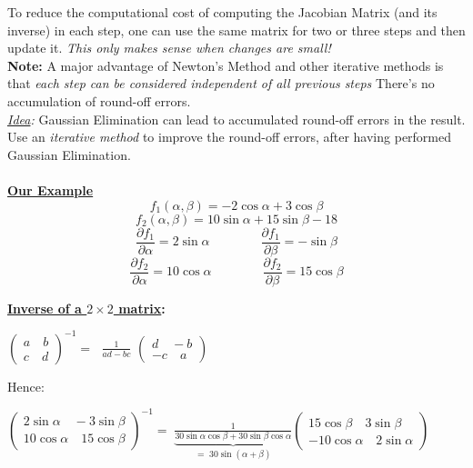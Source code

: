 \documentclass[a4paper,12pt]{report}
\begin{document}
	\noindent To reduce the computational cost of computing the Jacobian Matrix (and its inverse) in each step, one can use
	the same matrix for two or three steps and then update it. \textit{This only makes sense when changes are small!}\\
	
	\noindent\textbf{Note:} A major advantage of Newton's Method and other iterative methods is that \textit{each step can be
	 considered independent of all previous steps}  There's no accumulation of round-off errors.\\
	 
	 \noindent \textit{\underline{Idea}:} Gaussian Elimination can lead to accumulated round-off errors in the result. Use an
	 \textit{iterative method} to improve the round-off errors, after having performed Gaussian Elimination.\\ \\
	 
	 \noindent \textbf{\underline{Our Example}}\\
	 $$f_1(\alpha, \beta) = -2 \cos \alpha + 3 \cos \beta$$
	 $$f_2(\alpha, \beta) = 10 \sin \alpha + 15 \sin \beta - 18$$
	 $$\frac{\partial f_1}{\partial \alpha}= 2 \sin \alpha \qquad \qquad \frac{\partial f_1}{\partial \beta} = - \sin \beta$$
	  $$\frac{\partial f_2}{\partial \alpha}=10 \cos \alpha \qquad \qquad \frac{\partial f_2}{\partial \beta} = 15 \cos \beta$$
	  
	  \begin{center}
\bigskip

\fbox
{
	\parbox{0.5\textwidth}
	{
		\textbf{\underline{Inverse of a $2\times 2$ matrix}:}
		\begin{center}
		$
		\begin{pmatrix}
			a \quad b \\
			c \quad d			
		\end{pmatrix}^{-1}
		= \;
		$
		\Large
		$
		\frac{1}{ad-bc} \!\!
		$
		\normalsize
		$
		\begin{pmatrix}
			d \quad -b \\
			-c \quad a
		\end{pmatrix}
		$
		\end{center}
	}
}
\end{center}
	
	\noindent Hence:
	\begin{center}
	$
	\begin{pmatrix}
		2 \sin \alpha \quad -3 \sin \beta \\
		10 \cos \alpha \quad 15 \cos \beta
	\end{pmatrix}^{-1}
	= \;
	\underbrace{\frac{1}{30 \sin \alpha \cos \beta + 30 \sin \beta \cos \alpha}}_{= \; 30 \sin(\alpha + \beta)}
	\begin{pmatrix}
		15 \cos \beta \quad 3 \sin \beta \\
		-10 \cos \alpha \quad 2 \sin \alpha
	\end{pmatrix}
	$
	\end{center}
	
\end{document}

